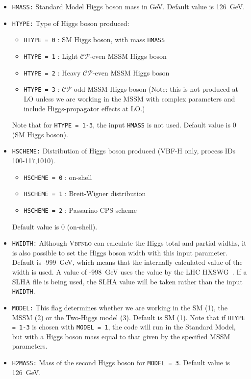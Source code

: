 \documentclass[english,12pt]{article}
\begin{document}
\begin{itemize}
\item {\tt HMASS:} Standard Model Higgs boson mass in GeV. Default value is 126~GeV. 
\item {\tt HTYPE:} Type of Higgs boson produced:
  \begin{itemize}
   \item {\tt HTYPE = 0} : SM Higgs boson, with mass {\tt HMASS}
   \item {\tt HTYPE = 1} : Light $\mathcal{CP}$-even MSSM Higgs boson
   \item {\tt HTYPE = 2} : Heavy $\mathcal{CP}$-even MSSM Higgs boson
   \item {\tt HTYPE = 3} : $\mathcal{CP}$-odd MSSM Higgs boson (Note: this is not produced at LO
unless we are working in the MSSM with complex parameters and include
Higgs-propagator effects at LO.)
  \end{itemize}
  Note that for {\tt HTYPE = 1-3}, the input {\tt HMASS} is not used.  Default
value is 0 (SM Higgs boson).
\item {\tt HSCHEME:} Distribution of Higgs boson produced (VBF-H only, process IDs 100-117,1010).
  \begin{itemize}
   \item {\tt HSCHEME = 0} : on-shell
   \item {\tt HSCHEME = 1} : Breit-Wigner distribution
   \item {\tt HSCHEME = 2} : Passarino CPS scheme~\cite{Passarino:2010qk,Goria:2011wa}
  \end{itemize}
  Default value is 0 (on-shell).
\item{\tt HWIDTH:} Although \textsc{Vbfnlo} can calculate the Higgs total and
partial widths, it is also possible to set the Higgs boson width with this input
parameter.  Default is -999~GeV, which means that the internally calculated
value of the width is used.  A value of -998~GeV uses the value by the LHC HXSWG~\cite{Dittmaier:2011ti}. If a SLHA file is being used, the SLHA value will
be taken rather than the input {\tt HWIDTH}.
\item {\tt MODEL:} This flag determines whether we are working in the SM
(1), the MSSM (2) or the Two-Higgs model (3). Default is SM (1).  Note
that if {\tt HTYPE = 1-3} is chosen with {\tt MODEL = 1}, the code will
run in the Standard Model, but with a Higgs boson mass equal to that
given by the specified MSSM parameters.
\item{\tt H2MASS:} Mass of the second Higgs boson for {\tt MODEL = 3}.
Default value is 126~GeV.

\end{itemize}
\end{document}
